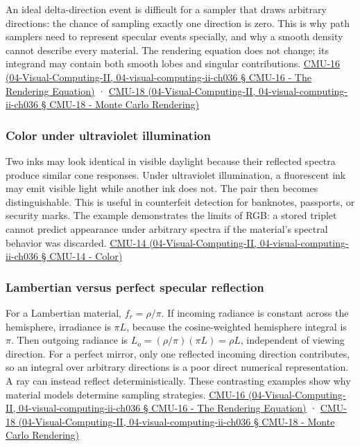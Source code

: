 An ideal delta-direction event is difficult for a sampler that draws arbitrary directions: the chance of sampling exactly one direction is zero. This is why path samplers need to represent specular events specially, and why a smooth density cannot describe every material. The rendering equation does not change; its integrand may contain both smooth lobes and singular contributions. \href{}{CMU-16 (04-Visual-Computing-II, 04-visual-computing-ii-ch036 § CMU-16 - The Rendering Equation)} · \href{}{CMU-18 (04-Visual-Computing-II, 04-visual-computing-ii-ch036 § CMU-18 - Monte Carlo Rendering)}

\subsubsection{Color under ultraviolet illumination}\label{color-under-ultraviolet-illumination}

Two inks may look identical in visible daylight because their reflected spectra produce similar cone responses. Under ultraviolet illumination, a fluorescent ink may emit visible light while another ink does not. The pair then becomes distinguishable. This is useful in counterfeit detection for banknotes, passports, or security marks. The example demonstrates the limits of RGB: a stored triplet cannot predict appearance under arbitrary spectra if the material's spectral behavior was discarded. \href{}{CMU-14 (04-Visual-Computing-II, 04-visual-computing-ii-ch036 § CMU-14 - Color)}

\subsubsection{Lambertian versus perfect specular reflection}\label{lambertian-versus-perfect-specular-reflection}

For a Lambertian material, \(f_r=\rho/\pi\). If incoming radiance is constant across the hemisphere, irradiance is \(\pi L\), because the cosine-weighted hemisphere integral is \(\pi\). Then outgoing radiance is \(L_o=(\rho/\pi)(\pi L)=\rho L\), independent of viewing direction. For a perfect mirror, only one reflected incoming direction contributes, so an integral over arbitrary directions is a poor direct numerical representation. A ray can instead reflect deterministically. These contrasting examples show why material models determine sampling strategies. \href{}{CMU-16 (04-Visual-Computing-II, 04-visual-computing-ii-ch036 § CMU-16 - The Rendering Equation)} · \href{}{CMU-18 (04-Visual-Computing-II, 04-visual-computing-ii-ch036 § CMU-18 - Monte Carlo Rendering)}

